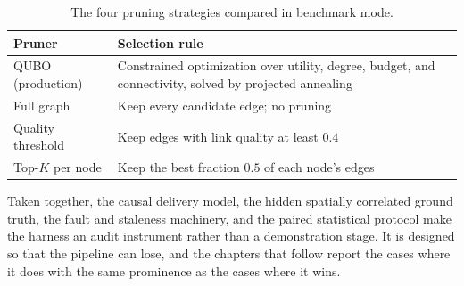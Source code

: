 \begin{table}[htbp]
  \centering
  \caption{The four pruning strategies compared in benchmark mode.}
  \label{tab:pruners}
  \begin{tabular}{@{}lp{8.2cm}@{}}
    \toprule
    Pruner & Selection rule \\
    \midrule
    QUBO (production) & Constrained optimization over utility, degree,
      budget, and connectivity, solved by projected annealing \\
    Full graph & Keep every candidate edge; no pruning \\
    Quality threshold & Keep edges with link quality at least $0.4$ \\
    Top-$K$ per node & Keep the best fraction $0.5$ of each node's edges \\
    \bottomrule
  \end{tabular}
\end{table}

Taken together, the causal delivery model, the hidden spatially
correlated ground truth, the fault and staleness machinery, and the
paired statistical protocol make the harness an audit instrument rather
than a demonstration stage. It is designed so that the pipeline can
lose, and the chapters that follow report the cases where it does with
the same prominence as the cases where it wins.
